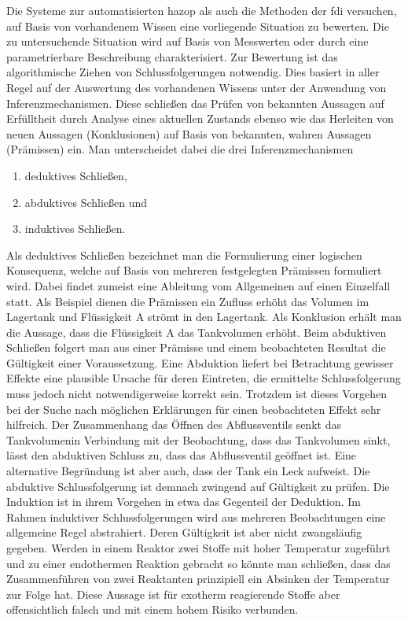 Die Systeme zur automatisierten \ac{hazop} als auch die Methoden der \ac{fdi} versuchen, auf Basis von vorhandenem Wissen eine vorliegende Situation zu bewerten. Die zu untersuchende Situation wird auf Basis von Messwerten oder durch eine parametrierbare Beschreibung charakterisiert. Zur Bewertung ist das algorithmische Ziehen von Schlussfolgerungen notwendig. Dies basiert in aller Regel auf der Auswertung des vorhandenen Wissens unter der Anwendung von \glqq Inferenzmechanismen\grqq { }. Diese schlie\ss{}en das Pr\"ufen von bekannten Aussagen auf Erf\"ulltheit durch Analyse eines aktuellen Zustands ebenso wie das Herleiten von neuen Aussagen (Konklusionen) auf Basis von bekannten, wahren Aussagen (Pr\"amissen) ein. Man unterscheidet dabei die drei Inferenzmechanismen \begin{enumerate}
\item deduktives Schlie\ss{}en,
\item abduktives Schlie\ss{}en und
\item induktives Schlie\ss{}en.
\end{enumerate} 
Als deduktives Schlie\ss{}en bezeichnet man die Formulierung einer logischen Konsequenz, welche auf Basis von mehreren festgelegten Pr\"amissen formuliert wird. Dabei findet zumeist eine Ableitung vom Allgemeinen auf einen Einzelfall statt. Als Beispiel dienen die Pr\"amissen ein Zufluss erh\"oht das Volumen im Lagertank und Fl\"ussigkeit A str\"omt in den Lagertank. Als Konklusion erh\"alt man die Aussage, dass die Fl\"ussigkeit A das Tankvolumen erh\"oht. \newline
Beim abduktiven Schlie\ss{}en folgert man aus einer Pr\"amisse und einem beobachteten Resultat die G\"ultigkeit einer Voraussetzung. Eine Abduktion liefert bei Betrachtung gewisser Effekte eine plausible Ursache f\"ur deren Eintreten, die ermittelte Schlussfolgerung muss jedoch nicht notwendigerweise korrekt sein. Trotzdem ist dieses Vorgehen bei der Suche nach m\"oglichen Erkl\"arungen f\"ur einen beobachteten Effekt sehr hilfreich. Der Zusammenhang \glqq das \"Offnen des Abflussventils senkt das Tankvolumen\grqq { }in Verbindung mit der Beobachtung, dass das Tankvolumen sinkt, l\"asst den abduktiven Schluss zu, dass das Abflussventil ge\"offnet ist. Eine alternative Begr\"undung ist aber auch, dass der Tank ein Leck aufweist. Die abduktive Schlussfolgerung ist demnach zwingend auf G\"ultigkeit zu pr\"ufen. \newline
Die Induktion ist in ihrem Vorgehen in etwa das Gegenteil der Deduktion. Im Rahmen induktiver Schlussfolgerungen wird aus mehreren Beobachtungen eine allgemeine Regel abstrahiert. Deren G\"ultigkeit ist aber nicht zwangsl\"aufig gegeben. Werden in einem Reaktor zwei Stoffe mit hoher Temperatur zugef\"uhrt und zu einer endothermen Reaktion gebracht so k\"onnte man schlie\ss{}en, dass das Zusammenf\"uhren von zwei Reaktanten prinzipiell ein Absinken der Temperatur zur Folge hat. Diese Aussage ist f\"ur exotherm reagierende Stoffe aber offensichtlich falsch und mit einem hohem Risiko verbunden. \newline
